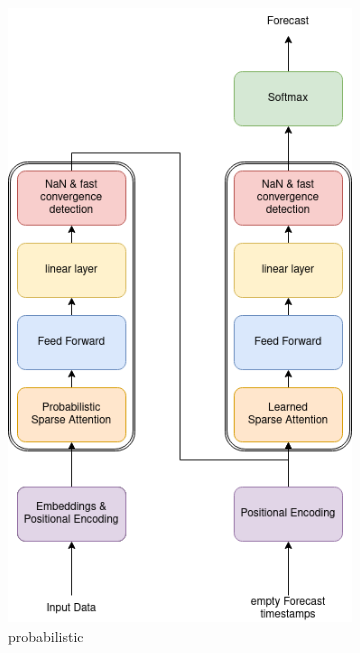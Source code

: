\documentclass{article}
\begin{document}
\begin{figure}[!ht]
    \hspace*{\fill}
    \begin{subfigure}[b]{0.4\linewidth}
        \includegraphics[width=\linewidth]{graphs/eFormer_probSparse.png}
        \caption{probabilistic}        
    \end{subfigure}
    \hfill
    \begin{subfigure}[b]{0.4\linewidth}

\end{subfigure}
\end{figure}
\end{document}
